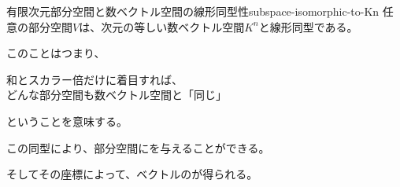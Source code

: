 \documentclass[../../../topic_linear-algebra]{subfiles}
\begin{document}
\begin{theorem}{有限次元部分空間と数ベクトル空間の線形同型性}{subspace-isomorphic-to-Kn}
  任意の部分空間$V$は、次元の等しい数ベクトル空間$K^n$と線形同型である。
\end{theorem}

このことはつまり、
\begin{emphabox}
  \begin{spacebox}
    \begin{center}
      和とスカラー倍だけに着目すれば、\\
      どんな部分空間も数ベクトル空間と「同じ」
    \end{center}
  \end{spacebox}
\end{emphabox}
ということを意味する。

\br

この同型により、部分空間にを与えることができる。

そしてその座標によって、ベクトルのが得られる。
\end{document}
